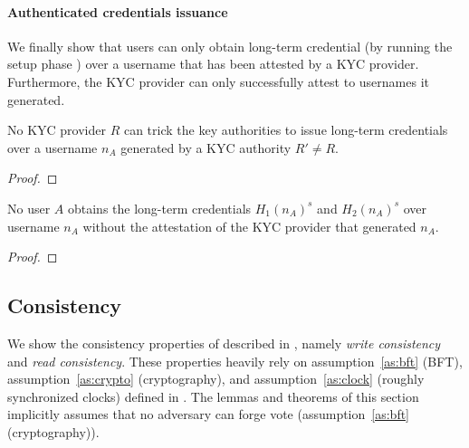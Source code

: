 \paragraph{Authenticated credentials issuance}
We finally show that users can only obtain long-term credential (by running the setup phase ) over a username that has been attested by a KYC provider. Furthermore, the KYC provider can only successfully attest to usernames it generated.

\begin{theorem}
    No KYC provider $R$ can trick the key authorities to issue long-term credentials over a username $n_A$ generated by a KYC authority $R' \neq R$.
\end{theorem}
\begin{proof}
\end{proof}

\begin{theorem}
    No user $A$ obtains the long-term credentials $H_1(n_A)^s$ and $H_2(n_A)^s$ over username $n_A$ without the attestation of the KYC provider that generated $n_A$.
\end{theorem}
\begin{proof}
\end{proof}


\subsection{Consistency} \label{sec:consistency}
We show the consistency properties of \sysname described in , namely \emph{write consistency} and \emph{read consistency}. These properties heavily rely on assumption~\ref{as:bft} (BFT), assumption~\ref{as:crypto} (cryptography), and assumption~\ref{as:clock} (roughly synchronized clocks) defined in .
%
The lemmas and theorems of this section implicitly assumes that no adversary can forge vote (assumption~\ref{as:bft} (cryptography)).

